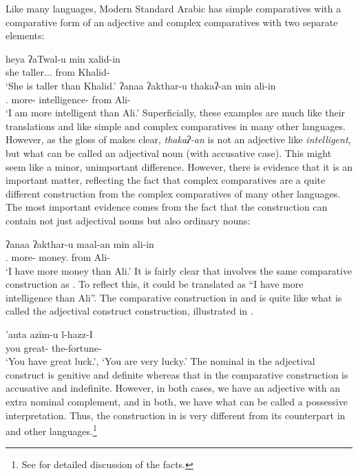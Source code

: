\documentclass[output=paper]{langsci/langscibook}
\begin{document}
Like many languages, Modern Standard Arabic has simple comparatives with a comparative form of an
adjective and complex comparatives with two separate elements:

\newpage

\ea\label{ex:key:4.34}
    \ea\label{ex:key:4.34a}
        \gll    heya    ʔaTwal-u           min    xalid-in\\
                she taller.\F.\Sg.\Nom{} from Khalid-\Gen{}\\
        \glt    \enquote*{She is taller than Khalid.}
    \ex\label{ex:key:4.34b}
        \gll    ʔanaa        ʔakthar-u    thakaʔ-an          min    ali-in\\
                \Fsg.\M{} more-\Nom{} intelligence-\Acc{} from Ali-\Gen{}\\
        \glt    \enquote*{I am more intelligent than Ali.}
    \z
\z
%
Superficially, these examples are much like their  translations
and like simple and complex comparatives in many other languages. However, as
the gloss of  makes clear, \emph{thakaʔ-an} is not an
adjective like \emph{intelligent}, but what can be called an adjectival noun
(with accusative case). This might seem like a minor, unimportant difference.
However, there is evidence that it is an important matter, reflecting the fact
that  complex comparatives are a quite different construction from
the complex comparatives of many other languages. The most important evidence
comes from the fact that the construction can contain not just adjectival nouns
but also ordinary nouns:

\ea\label{ex:key:4.35}
    \sn\gll ʔanaa        ʔakthar-u    maal-an      min    ali-in\\
            \Fsg.\M{} more-\Nom{} money.\Acc{} from Ali-\Gen{}\\
    \glt    \enquote*{I have more money than Ali.}
\z
%
It is fairly clear that  involves the same comparative
construction as . To reflect this, it could be translated as
\enquote{I have more intelligence than Ali}. The comparative construction in
 and  is quite like what is called the
adjectival construct construction, illustrated in .

\ea\label{ex:key:4.36}
    \sn\gll ’anta    azīm-u        l-hazz-I\\
            you    great-\Nom{}    the-fortune-\Gen{}\\
    \glt    \enquote*{You have great luck.}, \enquote*{You are very lucky.}
\z
%
The nominal in the adjectival construct is genitive and definite whereas that
in the comparative construction is accusative and indefinite. However, in both
cases, we have an adjective with an extra nominal complement, and in both, we
have what can be called a possessive interpretation. Thus, the construction in
 is very different from its counterpart in  and
other languages.\footnote{See \citet{AlsArnBor2017} for detailed discussion of
the facts.}
\end{document}
